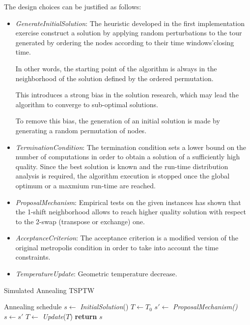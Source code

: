 \begin{homeworkProblem}
The design choices can be justified as follows:

\begin{itemize}
  \item \emph{GenerateInitialSolution}: The heuristic developed in the first implementation exercise construct a solution by applying random perturbations to the tour generated by ordering the nodes according to their time windows'closing time.
  
  In other words, the starting point of the algorithm is always in the neighborhood of the solution defined by the ordered permutation.
  
  This introduces a strong bias in the solution research, which may lead the algorithm to converge to sub-optimal solutions.
  
  To remove this bias, the generation of an initial solution is made by generating a random permutation of nodes. 
   \item \emph{TerminationCondition}: The termination condition sets a lower bound on the number of computations in order to obtain a solution of a sufficiently high quality.
  Since the best solution is known and the run-time distribution analysis is required, the algorithm execution is stopped once the global optimum or a maxmium run-time are reached.
  \item \emph{ProposalMechanism}: Empirical tests on the given instances has shown that the 1-shift neighborhood allows to reach higher quality solution with respect to the 2-swap (transpose or exchange) one.
  \item \emph{AcceptanceCriterion}: The acceptance criterion is a modified version of the original metropolis condition in order to take into account the time constraints.
  \item \emph{TemperatureUpdate}: Geometric temperature decrease.
\end{itemize}


\begin{algorithm}
\caption{Simulated Annealing TSPTW}
\label{SA:TSPTW}
\begin{algorithmic}[!h]
  \Require Annealing schedule
  \State $s \gets$ \emph{InitialSolution}()
  \State $T \gets T_0$  
    \State $s' \gets$ \emph{ProposalMechanism()} 
      \State $s \gets s'$
    \EndIf
  \State $T \gets$ \emph{Update}($T$) 
\EndWhile
  \State \textbf{return} $s$
\EndProcedure
\end{algorithmic}
\end{algorithm}


\end{homeworkProblem}
